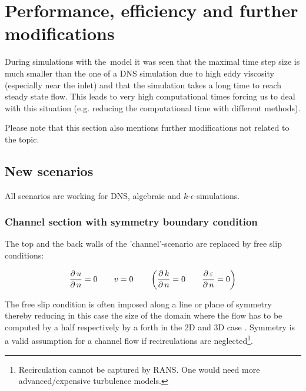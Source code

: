 \chapter{Performance, efficiency and further modifications} %
\label{cha:performance_efficiency_and_further_modifications}

During simulations with the \ke\,model it was seen that the maximal time step size is much smaller than the one of a DNS simulation due to high eddy viscosity (especially near the inlet) and that the simulation takes a long time to reach steady state flow. This leads to very high computational times forcing us to deal with this situation (e.g. reducing the computational time with different methods).

\noii Please note that this section also mentions further modifications not related to the topic.
 
\section{New scenarios} %
\label{sec:new_scenarios}

All scenarios are working for DNS, algebraic and $k$-$\epsilon$-simulations.



\subsection*{Channel section with symmetry boundary condition} %
\label{sub:channel_section_with_symmetry_boundary_condition}

The top and the back walls of the 'channel'-scenario are replaced by free slip conditions:

\begin{equation}
\frac{\partial\,u}{\partial\,n}=0
\qquad
v = 0
\qquad
\left(
\frac{\partial\,k}{\partial\,n}=0
\qquad
\frac{\partial\,\varepsilon}{\partial\,n}=0
\right)
\end{equation}  

\noii The free slip condition is often imposed along a line or plane of symmetry  thereby reducing in this case the size of the domain where the flow has to be computed by a half respectively by a forth in the 2D and 3D case \citep{griebel1998}. Symmetry is a valid assumption for a channel flow if recirculations are neglected\footnote{Recirculation cannot be captured by RANS. One would need more advanced/expensive turbulence models.}.

